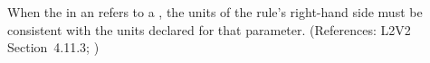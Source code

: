 When the  in an \AssignmentRule refers to a \Parameter, the
units of the rule's right-hand side must be consistent with the units
declared for that parameter.  (References: L2V2 Section~4.11.3;
)
